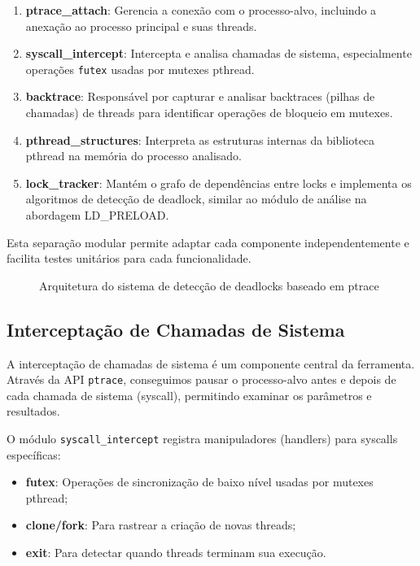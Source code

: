 \begin{enumerate}
    \item \textbf{ptrace\_attach}: Gerencia a conexão com o processo-alvo, incluindo a anexação ao processo principal e suas threads.

    \item \textbf{syscall\_intercept}: Intercepta e analisa chamadas de sistema, especialmente operações \texttt{futex} usadas por mutexes pthread.

    \item \textbf{backtrace}: Responsável por capturar e analisar backtraces (pilhas de chamadas) de threads para identificar operações de bloqueio em mutexes.

    \item \textbf{pthread\_structures}: Interpreta as estruturas internas da biblioteca pthread na memória do processo analisado.

    \item \textbf{lock\_tracker}: Mantém o grafo de dependências entre locks e implementa os algoritmos de detecção de deadlock, similar ao módulo de análise na abordagem LD\_PRELOAD.
\end{enumerate}

Esta separação modular permite adaptar cada componente independentemente e facilita testes unitários para cada funcionalidade.

\begin{figure}[h]
    \centering
    \caption{Arquitetura do sistema de detecção de deadlocks baseado em ptrace}
    \label{fig:ptrace_arquitetura}
\end{figure}

\subsection{Interceptação de Chamadas de Sistema}

A interceptação de chamadas de sistema é um componente central da ferramenta. Através da API \texttt{ptrace}, conseguimos pausar o processo-alvo antes e depois de cada chamada de sistema (syscall), permitindo examinar os parâmetros e resultados.

O módulo \texttt{syscall\_intercept} registra manipuladores (handlers) para syscalls específicas:

\begin{itemize}
    \item \textbf{futex}: Operações de sincronização de baixo nível usadas por mutexes pthread;
    \item \textbf{clone/fork}: Para rastrear a criação de novas threads;
    \item \textbf{exit}: Para detectar quando threads terminam sua execução.
\end{itemize}

